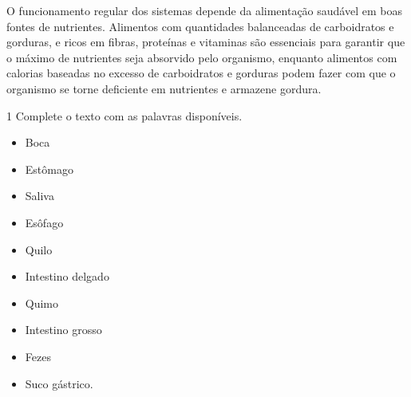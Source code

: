 {%

O funcionamento regular dos sistemas depende da alimentação saudável em
boas fontes de nutrientes. Alimentos com quantidades balanceadas de
carboidratos e gorduras, e ricos em fibras, proteínas e vitaminas são
essenciais para garantir que o máximo de nutrientes seja absorvido pelo
organismo, enquanto alimentos com calorias baseadas no excesso de
carboidratos e gorduras podem fazer com que o organismo se torne
deficiente em nutrientes e armazene gordura.}



\num{1} Complete o texto com as palavras disponíveis.

\begin{itemize}
\item Boca

\item Estômago

\item Saliva

\item Esôfago

\item Quilo

\item Intestino delgado

\item Quimo

\item Intestino grosso

\item Fezes

\item Suco gástrico.
\end{itemize}

